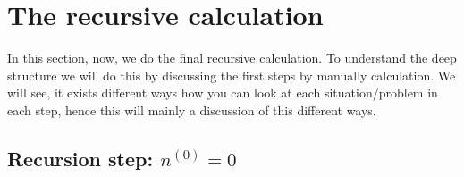 \chapter{The recursive calculation}
\label{ch:therecursivecalculation}
\minitoc
In this section, now, we do the final recursive calculation. To understand the deep structure we will do this by discussing the first steps by manually calculation. We will see, it exists different ways how you can look at each situation/problem in each step, hence this will mainly a discussion of this different ways.
\section{Recursion step: $n^{\left(0\right)} = 0$}
\label{s:recursionstepn0_0}






















